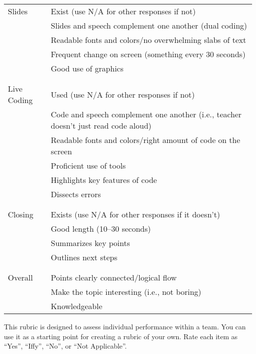 \begin{longtable}{p{}p{}}
  Slides
  & Exist (use N/A for other responses if not) \\
  & Slides and speech complement one another (dual coding) \\
  & Readable fonts and colors/no overwhelming slabs of text \\
  & Frequent change on screen (something every 30 seconds) \\
  & Good use of graphics \\
  \\ [-1.5ex] \hline \\ [-1.5ex]

  Live Coding
  & Used (use N/A for other responses if not) \\
  & Code and speech complement one another (i.e., teacher doesn't just read code aloud) \\
  & Readable fonts and colors/right amount of code on the screen \\
  & Proficient use of tools \\
  & Highlights key features of code \\
  & Dissects errors \\
  \\ [-1.5ex] \hline \\ [-1.5ex]

  Closing
  & Exists (use N/A for other responses if it doesn't) \\
  & Good length (10--30 seconds) \\
  & Summarizes key points \\
  & Outlines next steps \\
  \\ [-1.5ex] \hline \\ [-1.5ex]

  Overall
  & Points clearly connected/logical flow \\
  & Make the topic interesting (i.e., not boring) \\
  & Knowledgeable \\

\end{longtable}


This rubric is designed to assess individual performance within a
team. You can use it as a starting point for creating a rubric of
your own. Rate each item as ``Yes'', ``Iffy'', ``No'', or ``Not Applicable''.

